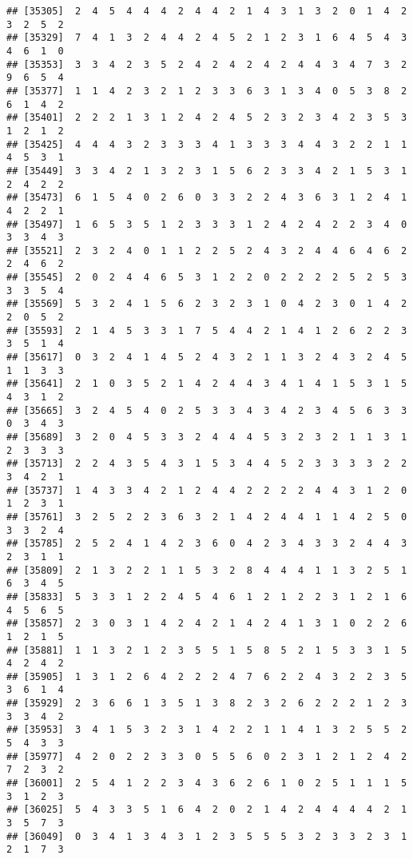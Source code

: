 \documentclass[
]{article}
\begin{document}
\begin{verbatim}
## [35305]  2  4  5  4  4  4  2  4  4  2  1  4  3  1  3  2  0  1  4  2  3  2  5  2
## [35329]  7  4  1  3  2  4  4  2  4  5  2  1  2  3  1  6  4  5  4  3  4  6  1  0
## [35353]  3  3  4  2  3  5  2  4  2  4  2  4  2  4  4  3  4  7  3  2  9  6  5  4
## [35377]  1  1  4  2  3  2  1  2  3  3  6  3  1  3  4  0  5  3  8  2  6  1  4  2
## [35401]  2  2  2  1  3  1  2  4  2  4  5  2  3  2  3  4  2  3  5  3  1  2  1  2
## [35425]  4  4  4  3  2  3  3  3  4  1  3  3  3  4  4  3  2  2  1  1  4  5  3  1
## [35449]  3  3  4  2  1  3  2  3  1  5  6  2  3  3  4  2  1  5  3  1  2  4  2  2
## [35473]  6  1  5  4  0  2  6  0  3  3  2  2  4  3  6  3  1  2  4  1  4  2  2  1
## [35497]  1  6  5  3  5  1  2  3  3  3  1  2  4  2  4  2  2  3  4  0  3  3  4  3
## [35521]  2  3  2  4  0  1  1  2  2  5  2  4  3  2  4  4  6  4  6  2  2  4  6  2
## [35545]  2  0  2  4  4  6  5  3  1  2  2  0  2  2  2  2  5  2  5  3  3  3  5  4
## [35569]  5  3  2  4  1  5  6  2  3  2  3  1  0  4  2  3  0  1  4  2  2  0  5  2
## [35593]  2  1  4  5  3  3  1  7  5  4  4  2  1  4  1  2  6  2  2  3  3  5  1  4
## [35617]  0  3  2  4  1  4  5  2  4  3  2  1  1  3  2  4  3  2  4  5  1  1  3  3
## [35641]  2  1  0  3  5  2  1  4  2  4  4  3  4  1  4  1  5  3  1  5  4  3  1  2
## [35665]  3  2  4  5  4  0  2  5  3  3  4  3  4  2  3  4  5  6  3  3  0  3  4  3
## [35689]  3  2  0  4  5  3  3  2  4  4  4  5  3  2  3  2  1  1  3  1  2  3  3  3
## [35713]  2  2  4  3  5  4  3  1  5  3  4  4  5  2  3  3  3  3  2  2  3  4  2  1
## [35737]  1  4  3  3  4  2  1  2  4  4  2  2  2  2  4  4  3  1  2  0  1  2  3  1
## [35761]  3  2  5  2  2  3  6  3  2  1  4  2  4  4  1  1  4  2  5  0  3  3  2  4
## [35785]  2  5  2  4  1  4  2  3  6  0  4  2  3  4  3  3  2  4  4  3  2  3  1  1
## [35809]  2  1  3  2  2  1  1  5  3  2  8  4  4  4  1  1  3  2  5  1  6  3  4  5
## [35833]  5  3  3  1  2  2  4  5  4  6  1  2  1  2  2  3  1  2  1  6  4  5  6  5
## [35857]  2  3  0  3  1  4  2  4  2  1  4  2  4  1  3  1  0  2  2  6  1  2  1  5
## [35881]  1  1  3  2  1  2  3  5  5  1  5  8  5  2  1  5  3  3  1  5  4  2  4  2
## [35905]  1  3  1  2  6  4  2  2  2  4  7  6  2  2  4  3  2  2  3  5  3  6  1  4
## [35929]  2  3  6  6  1  3  5  1  3  8  2  3  2  6  2  2  2  1  2  3  3  3  4  2
## [35953]  3  4  1  5  3  2  3  1  4  2  2  1  1  4  1  3  2  5  5  2  5  4  3  3
## [35977]  4  2  0  2  2  3  3  0  5  5  6  0  2  3  1  2  1  2  4  2  7  2  3  2
## [36001]  2  5  4  1  2  2  3  4  3  6  2  6  1  0  2  5  1  1  1  5  3  1  2  3
## [36025]  5  4  3  3  5  1  6  4  2  0  2  1  4  2  4  4  4  4  2  1  3  5  7  3
## [36049]  0  3  4  1  3  4  3  1  2  3  5  5  5  3  2  3  3  2  3  1  2  1  7  3

\end{verbatim}
\end{document}
